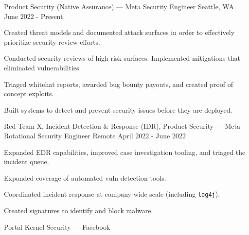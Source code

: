 
\begin{cventries}

\cventry
{Product Security (Native Assurance) — Meta} %
{Security Engineer} %
{Seattle, WA} %
{June 2022 - Present} %
{
	\begin{cvitems} %
		\item {Created threat models and documented attack surfaces in order to effectively prioritize security review efforts.}
		\item {Conducted security reviews of high-risk surfaces. Implemented mitigations that eliminated vulnerabilities.}
		\item {Triaged whitehat reports,  awarded bug bounty payouts, and created proof of concept exploits.}
		\item {Built systems to detect and prevent security issues before they are deployed.}
	\end{cvitems}
}
\cventry
{Red Team X, Incident Detection \& Response (IDR), Product Security —  Meta} %
{Rotational Security Engineer} %
{Remote} %
{April 2022 - June 2022} %
{
	\begin{cvitems} %
		\item {Expanded EDR capabilities, improved case investigation tooling, and triaged the incident queue.}
		\item {Expanded coverage of automated vuln detection tools.}
		\item {Coordinated incident response at company-wide scale (including \texttt{log4j}).}
		\item {Created signatures to identify and block malware.}
	\end{cvitems}
}
\cventry
{Portal Kernel Security — Facebook} %

\end{cventries}
